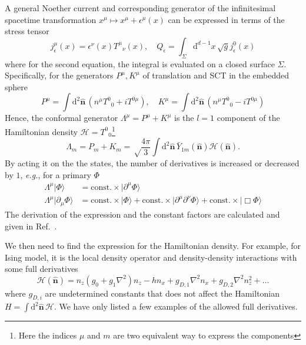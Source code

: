 \documentclass{timesjhep}
\begin{document}
A general Noether current and corresponding generator of the infinitesimal spacetime transformation $x^\mu\mapsto x^\mu+\epsilon^\mu(x)$ can be expressed in terms of the stress tensor 
\begin{equation}
    j_\epsilon^\mu(x)=\epsilon^\nu(x)T^\mu{}_\nu(x),\quad Q_\epsilon=\int_\Sigma\mathrm{d}^{d-1}x\,\sqrt{g}j_\epsilon^0(x) 
\end{equation}
where for the second equation, the integral is evaluated on a closed surface $\Sigma$. Specifically, for the generators $P^\mu,K^\mu$ of translation and SCT in the embedded sphere
\begin{equation}
    P^\mu=\int\mathrm{d}^2\hat{\mathbf{n}}\,(n^\mu T^0{}_0+iT^{0\mu}),\quad K^\mu=\int\mathrm{d}^2\hat{\mathbf{n}}\,(n^\mu T^0{}_0-iT^{0\mu})
\end{equation} 
Hence, the conformal generator $\Lambda^\mu=P^\mu+K^\mu$ is the $l=1$ component of the Hamiltonian density $\mathcal{H}=T^0{}_0$\footnote{Here the indices $\mu$ and $m$ are two equivalent way to express the components}
\begin{equation}
    \Lambda_m=P_m+K_m=\sqrt\frac{4\pi}{3}\int\mathrm{d}^2\hat{\mathbf{n}}\,\bar{Y}_{1m}(\hat{\mathbf{n}})\mathcal{H}(\hat{\mathbf{n}}).
\end{equation}
By acting it on the the states, the number of derivatives is increased or decreased by $1$, \textit{e.g.}, for a primary $\Phi$
\begin{align}
    \Lambda^\mu|\Phi\rangle&=\mathrm{const.}\times|\partial^\mu\Phi\rangle\nonumber\\     \Lambda^\mu|\partial_\mu\Phi\rangle&=\mathrm{const.}\times|\Phi\rangle+\mathrm{const.}\times|\partial^\mu\partial^\nu\Phi\rangle+\mathrm{const.}\times|\Box\Phi\rangle
\end{align}
The derivation of the expression and the constant factors are calculated and given in Ref.~\cite{}.

We then need to find the expression for the Hamiltonian density. For example, for Ising model, it is the local density operator and density-density interactions with some full derivatives 
\begin{equation}
    \mathcal{H}(\hat{\mathbf{n}})=n_z\left(g_0+g_1\nabla^2\right)n_z-hn_x+g_{D,1}\nabla^2n_x+g_{D,2}\nabla^2n_z^2+\dots
\end{equation}
where $g_{D,i}$ are undetermined constants that does not affect the Hamiltonian $H=\int\mathrm{d}^2\hat{\mathbf{n}}\,\mathcal{H}$. We have only listed a few examples of the allowed full derivatives. 
\end{document}
